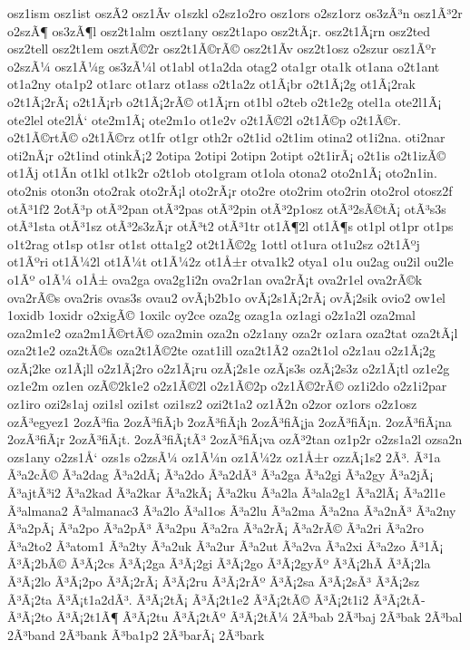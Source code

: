 {osz1ism
osz1ist
oszÃ­2
osz1Ã­v
o1szkl
o2sz1o2ro
osz1ors
o2sz1orz
os3zÃ³n
osz1Ã³2r
o2szÃ¶
os3zÃ¶l
osz2t1alm
oszt1any
osz2t1apo
osz2tÃ¡r.
osz2t1Ã¡rn
osz2ted
osz2tell
osz2t1em
osztÃ©2r
osz2t1Ã©rÃ©
osz2t1Ã­v
osz2t1osz
o2szur
osz1Ãºr
o2szÃ¼
osz1Ã¼g
os3zÃ¼l
ot1abl
ot1a2da
otag2
ota1gr
ota1k
ot1ana
o2t1ant
ot1a2ny
ota1p2
ot1arc
ot1arz
ot1ass
o2t1a2z
ot1Ã¡br
o2t1Ã¡2g
ot1Ã¡2rak
o2t1Ã¡2rÃ¡
o2t1Ã¡rb
o2t1Ã¡2rÃ©
ot1Ã¡rn
ot1bl
o2teb
o2t1e2g
otel1a
ote2l1Ã¡
ote2lel
ote2lÅ‘
ote2m1Ã¡
ote2m1o
ot1e2v
o2t1Ã©2l
o2t1Ã©p
o2t1Ã©r.
o2t1Ã©rtÃ©
o2t1Ã©rz
ot1fr
ot1gr
oth2r
o2t1id
o2t1im
otina2
ot1i2na.
oti2nar
oti2nÃ¡r
o2t1ind
otinkÃ¡2
2otipa
2otipi
2otipn
2otipt
o2t1irÃ¡
o2t1is
o2t1izÃ©
ot1Ã­j
ot1Ã­n
ot1kl
ot1k2r
o2t1ob
oto1gram
ot1ola
otona2
oto2n1Ã¡
oto2n1in.
oto2nis
oton3n
oto2rak
oto2rÃ¡l
oto2rÃ¡r
oto2re
oto2rim
oto2rin
oto2rol
otosz2f
otÃ³1f2
2otÃ³p
otÃ³2pan
otÃ³2pas
otÃ³2pin
otÃ³2p1osz
otÃ³2sÃ©tÃ¡
otÃ³s3s
otÃ³1sta
otÃ³1sz
otÃ³2s3zÃ¡r
otÃ³t2
otÃ³1tr
ot1Ã¶2l
ot1Ã¶s
ot1pl
ot1pr
ot1ps
o1t2rag
ot1sp
ot1sr
ot1st
otta1g2
ot2t1Ã©2g
1ottl
ot1ura
ot1u2sz
o2t1Ãºj
ot1Ãºri
ot1Ã¼2l
ot1Ã¼t
ot1Ã¼2z
ot1Å±r
otva1k2
otya1
o1u
ou2ag
ou2il
ou2le
o1Ãº
o1Ã¼
o1Å±
ova2ga
ova2g1i2n
ova2r1an
ova2rÃ¡t
ova2r1el
ova2rÃ©k
ova2rÃ©s
ova2ris
ovas3s
ovau2
ovÃ¡b2b1o
ovÃ¡2s1Ã¡2rÃ¡
ovÃ¡2sik
ovio2
ow1el
1oxidb
1oxidr
o2xigÃ©
1oxilc
oy2ce
oza2g
ozag1a
oz1agi
o2z1a2l
oza2mal
oza2m1e2
oza2m1Ã©rtÃ©
oza2min
oza2n
o2z1any
oza2r
oz1ara
oza2tat
oza2tÃ¡l
oza2t1e2
oza2tÃ©s
oza2t1Ã©2te
ozat1ill
oza2t1Ã­2
oza2t1ol
o2z1au
o2z1Ã¡2g
ozÃ¡2ke
oz1Ã¡ll
o2z1Ã¡2ro
o2z1Ã¡ru
ozÃ¡2s1e
ozÃ¡s3s
ozÃ¡2s3z
o2z1Ã¡tl
oz1e2g
oz1e2m
oz1en
ozÃ©2k1e2
o2z1Ã©2l
o2z1Ã©2p
o2z1Ã©2rÃ©
oz1i2do
o2z1i2par
oz1iro
ozi2s1aj
ozi1sl
ozi1st
ozi1sz2
ozi2t1a2
oz1Ã­2n
o2zor
oz1ors
o2z1osz
ozÃ³egyez1
2ozÃ³fia
2ozÃ³fiÃ¡b
2ozÃ³fiÃ¡h
2ozÃ³fiÃ¡ja
2ozÃ³fiÃ¡n.
2ozÃ³fiÃ¡na
2ozÃ³fiÃ¡r
2ozÃ³fiÃ¡t.
2ozÃ³fiÃ¡tÃ³
2ozÃ³fiÃ¡va
ozÃ³2tan
oz1p2r
o2zs1a2l
ozsa2n
ozs1any
o2zs1Å‘
ozs1s
o2zsÃ¼
oz1Ã¼n
oz1Ã¼2z
oz1Å±r
ozzÃ¡1s2
2Ã³.
Ã³1a
Ã³a2cÃ©
Ã³a2dag
Ã³a2dÃ¡
Ã³a2do
Ã³a2dÃ³
Ã³a2ga
Ã³a2gi
Ã³a2gy
Ã³a2jÃ¡
Ã³ajtÃ³i2
Ã³a2kad
Ã³a2kar
Ã³a2kÃ¡
Ã³a2ku
Ã³a2la
Ã³ala2g1
Ã³a2lÃ¡
Ã³a2l1e
Ã³almana2
Ã³almanac3
Ã³a2lo
Ã³al1os
Ã³a2lu
Ã³a2ma
Ã³a2na
Ã³a2nÃ³
Ã³a2ny
Ã³a2pÃ¡
Ã³a2po
Ã³a2pÃ³
Ã³a2pu
Ã³a2ra
Ã³a2rÃ¡
Ã³a2rÃ©
Ã³a2ri
Ã³a2ro
Ã³a2to2
Ã³atom1
Ã³a2ty
Ã³a2uk
Ã³a2ur
Ã³a2ut
Ã³a2va
Ã³a2xi
Ã³a2zo
Ã³1Ã¡
Ã³Ã¡2bÃ©
Ã³Ã¡2cs
Ã³Ã¡2ga
Ã³Ã¡2gi
Ã³Ã¡2go
Ã³Ã¡2gyÃº
Ã³Ã¡2hÃ­
Ã³Ã¡2la
Ã³Ã¡2lo
Ã³Ã¡2po
Ã³Ã¡2rÃ¡
Ã³Ã¡2ru
Ã³Ã¡2rÃº
Ã³Ã¡2sa
Ã³Ã¡2sÃ³
Ã³Ã¡2sz
Ã³Ã¡2ta
Ã³Ã¡t1a2dÃ³.
Ã³Ã¡2tÃ¡
Ã³Ã¡2t1e2
Ã³Ã¡2tÃ©
Ã³Ã¡2t1i2
Ã³Ã¡2tÃ­
Ã³Ã¡2to
Ã³Ã¡2t1Ã¶
Ã³Ã¡2tu
Ã³Ã¡2tÃº
Ã³Ã¡2tÃ¼
2Ã³bab
2Ã³baj
2Ã³bak
2Ã³bal
2Ã³band
2Ã³bank
Ã³ba1p2
2Ã³barÃ¡
2Ã³bark
}

